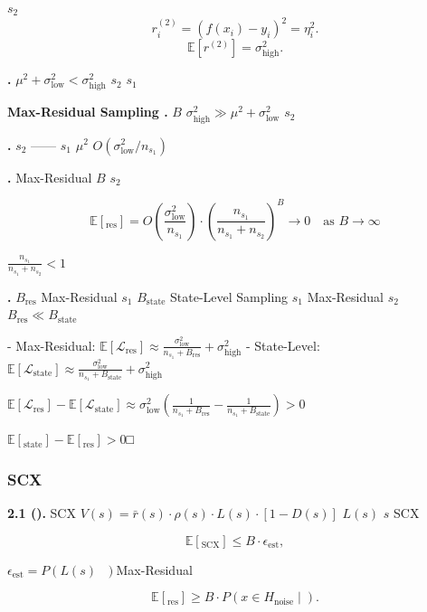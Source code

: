\documentclass[
  12pt,
]{article}
\begin{document}
 \(s_2\)  \[r_i^{(2)} = (f(x_i) - y_i)^2 = \eta_i^2.\]
\[\mathbb{E}[r^{(2)}] = \sigma^2_{\text{high}}.\]

\textbf{.} 
\(\mu^2 + \sigma^2_{\text{low}} < \sigma^2_{\text{high}}\) \(s_2\)
 \(s_1\) 

\textbf{Max-Residual Sampling .}  \(B\) 
\(\sigma^2_{\text{high}} \gg \mu^2 + \sigma^2_{\text{low}}\)
\(s_2\)

\textbf{.}  \(s_2\)
------ \(s_1\)
 \(\mu^2\) 
\(O(\sigma^2_{\text{low}} / n_{s_1})\)

\textbf{.}  Max-Residual  \(B\)  \(s_2\) 

\[\mathbb{E}[\text{}_{\text{res}}] = O\left(\frac{\sigma^2_{\text{low}}}{n_{s_1}}\right) \cdot \left(\frac{n_{s_1}}{n_{s_1} + n_{s_2}}\right)^B \to 0 \quad \text{as } B \to \infty\]

 \(\frac{n_{s_1}}{n_{s_1}+n_{s_2}} < 1\)

\textbf{.}  \(B_{\text{res}}\)  Max-Residual  \(s_1\)
\(B_{\text{state}}\)  State-Level Sampling  \(s_1\)
 Max-Residual 
\(s_2\)\(B_{\text{res}} \ll B_{\text{state}}\)

 - Max-Residual:
\(\mathbb{E}[\mathcal{L}_{\text{res}}] \approx \frac{\sigma^2_{\text{low}}}{n_{s_1} + B_{\text{res}}} + \sigma^2_{\text{high}}\)
- State-Level:
\(\mathbb{E}[\mathcal{L}_{\text{state}}] \approx \frac{\sigma^2_{\text{low}}}{n_{s_1} + B_{\text{state}}} + \sigma^2_{\text{high}}\)

\(\mathbb{E}[\mathcal{L}_{\text{res}}] - \mathbb{E}[\mathcal{L}_{\text{state}}] \approx \sigma^2_{\text{low}}\left(\frac{1}{n_{s_1} + B_{\text{res}}} - \frac{1}{n_{s_1} + B_{\text{state}}}\right) > 0\)


\(\mathbb{E}[\text{}_{\text{state}}] - \mathbb{E}[\text{}_{\text{res}}] > 0\)□

\subsubsection{SCX
}\label{scx-ux72b6ux6001ux7ea7ux91c7ux6837ux7684ux4e0aux754c}

\textbf{ 2.1 ().}  SCX 
\(V(s) = \bar{r}(s) \cdot \rho(s) \cdot L(s) \cdot [1 - D(s)]\)
 \(L(s)\)  \(s\)
 SCX 

\[\mathbb{E}[\text{}_{\text{SCX}}] \leq B \cdot \epsilon_{\text{est}},\]


\(\epsilon_{\text{est}} = P(L(s) \text{ })\)Max-Residual


\[\mathbb{E}[\text{}_{\text{res}}] \geq B \cdot P(x \in H_{\text{noise}} \mid \text{}).\]
\end{document}
